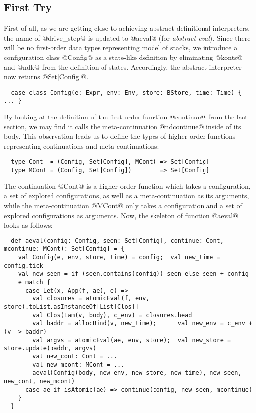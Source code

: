 \documentclass[acmsmall, screen]{acmart}\settopmatter{}
\begin{document}
\subsection{First Try}

First of all, as we are getting close to achieving abstract definitional interpreters,
the name of @drive_step@ is updated to @aeval@ (for \emph{abstract eval}).
Since there will be no first-order data types representing model of stacks,
we introduce a configuration class @Config@ as a state-like definition by eliminating
@konts@ and @ndk@ from the definition of states. Accordingly, the abstract interpreter
now returns @Set[Config]@.

\begin{lstlisting}
  case class Config(e: Expr, env: Env, store: BStore, time: Time) { ... }
\end{lstlisting}

By looking at the definition of the first-order function @continue@ from the last section,
we may find it calls the meta-continuation @ndcontinue@ inside of its body.
This observation leads us to define the types of higher-order functions representing
continuations and meta-continuations:

\begin{lstlisting}
  type Cont  = (Config, Set[Config], MCont) => Set[Config]
  type MCont = (Config, Set[Config])        => Set[Config]
\end{lstlisting}

The continuation @Cont@ is a higher-order function which takes a configuration, a set of explored
configurations, as well as a meta-continuation as its arguments, while the meta-continuation
@MCont@ only takes a configuration and a set of explored configurations as arguments.
Now, the skeleton of function @aeval@ looks as follows:

\begin{lstlisting}
  def aeval(config: Config, seen: Set[Config], continue: Cont, mcontinue: MCont): Set[Config] = {
    val Config(e, env, store, time) = config;  val new_time = config.tick
    val new_seen = if (seen.contains(config)) seen else seen + config
    e match {
      case Let(x, App(f, ae), e) =>
        val closures = atomicEval(f, env, store).toList.asInstanceOf[List[Clos]]
        val Clos(Lam(v, body), c_env) = closures.head
        val baddr = allocBind(v, new_time);      val new_env = c_env + (v -> baddr)
        val argvs = atomicEval(ae, env, store);  val new_store = store.update(baddr, argvs)
        val new_cont: Cont = ...
        val new_mcont: MCont = ...
        aeval(Config(body, new_env, new_store, new_time), new_seen, new_cont, new_mcont)
      case ae if isAtomic(ae) => continue(config, new_seen, mcontinue)
    }
  }
\end{lstlisting}
\end{document}
